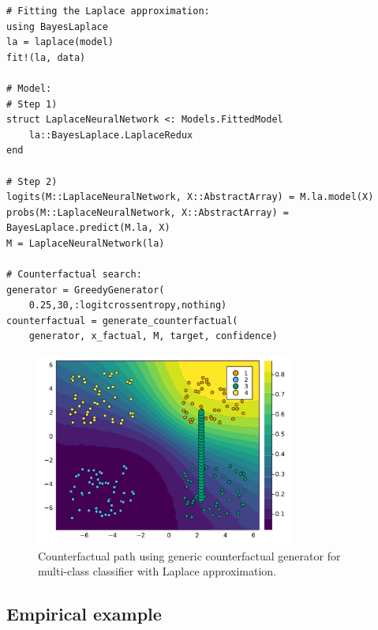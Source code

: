 \documentclass{juliacon}
\begin{document}
\begin{lstlisting}
# Fitting the Laplace approximation:
using BayesLaplace
la = laplace(model)
fit!(la, data)

# Model:
# Step 1)
struct LaplaceNeuralNetwork <: Models.FittedModel
    la::BayesLaplace.LaplaceRedux
end

# Step 2)
logits(M::LaplaceNeuralNetwork, X::AbstractArray) = M.la.model(X)
probs(M::LaplaceNeuralNetwork, X::AbstractArray) = BayesLaplace.predict(M.la, X)
M = LaplaceNeuralNetwork(la)

# Counterfactual search:
generator = GreedyGenerator(
    0.25,30,:logitcrossentropy,nothing)
counterfactual = generate_counterfactual(
    generator, x_factual, M, target, confidence) 
\end{lstlisting}

\begin{figure}

{\centering \includegraphics[width=3.33333in,height=2.5in]{www/ce_multi_laplace.png}

}

\caption{\label{fig-multi-laplace}Counterfactual path using generic
counterfactual generator for multi-class classifier with Laplace
approximation.}

\end{figure}

\hypertarget{empirical-example}{%
\subsection{Empirical example}\label{empirical-example}}
\end{document}
